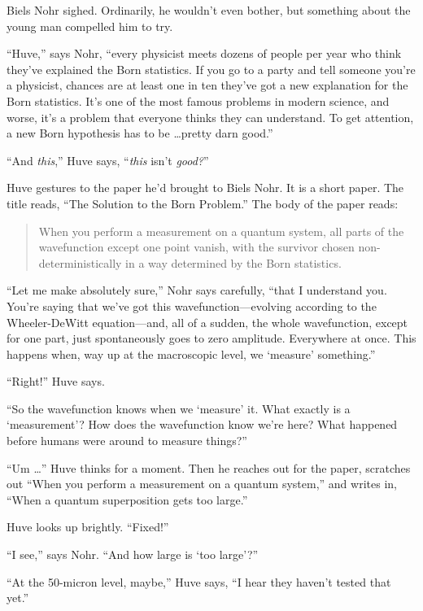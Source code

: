 {
 Biels Nohr sighed. Ordinarily, he wouldn't even
bother, but something about the young man compelled him to try.}

{
 ``Huve,'' says Nohr,
``every physicist meets dozens of people per year who
think they've explained the Born statistics. If you go
to a party and tell someone you're a physicist, chances
are at least one in ten they've got a new explanation
for the Born statistics. It's one of the most famous
problems in modern science, and worse, it's a problem
that everyone thinks they can understand. To get attention, a new Born
hypothesis has to be \ldots pretty darn good.''}

{
 ``And \textit{this},'' Huve
says, ``\textit{this} isn't
\textit{good?}''}

{
 Huve gestures to the paper he'd brought to Biels
Nohr. It is a short paper. The title reads, ``The
Solution to the Born Problem.'' The body of the paper
reads:}

\begin{quote}
{
 When you perform a measurement on a quantum system, all parts of
the wavefunction except one point vanish, with the survivor chosen
non-deterministically in a way determined by the Born statistics.}
\end{quote}

{
 ``Let me make absolutely
sure,'' Nohr says carefully, ``that
I understand you. You're saying that
we've got this wavefunction---evolving according to the
Wheeler-DeWitt equation---and, all of a sudden, the whole wavefunction,
except for one part, just spontaneously goes to zero amplitude.
Everywhere at once. This happens when, way up at the macroscopic level,
we `measure'
something.''}

{
 ``Right!'' Huve says.}

{
 ``So the wavefunction knows when we
`measure' it. What exactly is a
`measurement'? How does the wavefunction
know we're here? What happened before humans were
around to measure things?''}

{
 ``Um \ldots'' Huve thinks for a
moment. Then he reaches out for the paper, scratches out
``When you perform a measurement on a quantum
system,'' and writes in, ``When a
quantum superposition gets too large.''}

{
 Huve looks up brightly.
``Fixed!''}

{
 ``I see,'' says Nohr.
``And how large is `too
large'?''}

{
 ``At the 50-micron level,
maybe,'' Huve says, ``I hear they
haven't tested that yet.''}


